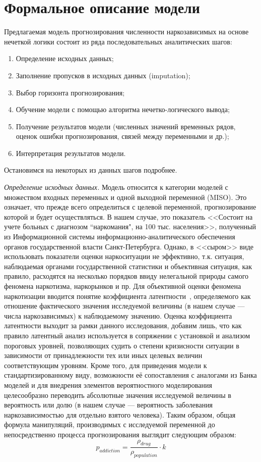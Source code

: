 \section{Формальное описание модели}
Предлагаемая модель прогнозирования численности наркозависимых на основе
нечеткой логики состоит из ряда последовательных аналитических шагов:
\begin{enumerate}
    \item Определение исходных данных;
    \item Заполнение пропусков в исходных данных (imputation);
    \item Выбор горизонта прогнозирования;
    \item Обучение модели с помощью алгоритма нечетко-логического вывода;
    \item Получение результатов модели (численных значений временных рядов,
        оценок ошибки прогнозирования, связей между переменными и др.);
    \item Интерпретация результатов модели.
\end{enumerate}
Остановимся на некоторых из данных шагов подробнее. 

\textit{Определение исходных данных.} Модель относится к категории моделей с
множеством входных переменных и одной выходной переменной (MISO). Это означает,
что прежде всего определиться с целевой переменной, прогнозирование которой и
будет осуществляться. В нашем случае, это показатель <<Состоит на учете больных
с диагнозом ``наркомания", на 100 тыс. населения>>, полученный из Информационной
системы информационно-аналитического обеспечения органов государственной власти
Санкт-Петербурга. Однако, в <<сыром>> виде использовать показатели оценки
наркоситуации не эффективно, т.к. ситуация, наблюдаемая органами государственной
статистики и объективная ситуация, как правило, расходятся на несколько порядков
ввиду нелегальной природы самого феномена наркотизма, наркорынков и пр. Для
объективной оценки феномена наркотизации вводится понятие коэффициента
латентности~\cite{Zakharov2012}, определяемого как отношение фактического
значения исследуемой величины (в нашем случае --- числа наркозависимых) к
наблюдаемому значению.  Оценка коэффициента латентности выходит за рамки данного
исследования, добавим лишь, что как правило латентный анализ используется  в
сопряжении с установкой и анализом пороговых уровней, позволяющих судить о
степени кризисности ситуации в зависимости от принадлежности тех или иных
целевых величин соответствующим уровням. Кроме того, для приведения модели к
стандартизированному виду, возможности её сопоставления с аналогами из Банка
моделей и для внедрения элементов вероятностного моделирования целесообразно
переводить абсолютные значения исследуемой величины в вероятность или долю (в
нашем случае --- вероятность заболевания наркозависимостью для отдельно взятого
человека). Таким образом, общая формула манипуляций, производимых с исследуемой
переменной до непосредственно процесса прогнозирования выглядит следующим
образом:
\begin{equation}
    p_{addiction} = \frac{\rho_{drug}}{\rho_{population}}\cdot k
\end{equation}

